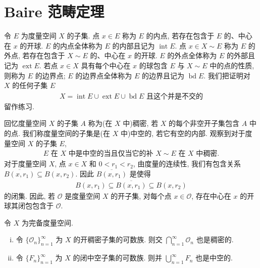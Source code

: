 \documentclass[../../main.tex]{subfiles}
\begin{document}
\section{Baire 范畴定理}\label{section:ch10-baire}

令 $E$ 为度量空间 $X$ 的子集. 点 $x\in E$ 称为 $E$ 的内点, 若存在包含于 $E$ 的、中心在 $x$ 的开球. $E$ 的内点全体称为 $E$ 的内部且记为 $\operatorname{int}E$. 点 $x\in X\sim E$ 称为 $E$ 的外点, 若存在包含于 $X\sim E$ 的、中心在 $x$ 的开球. $E$ 的外点全体称为 $E$ 的外部且记为 $\operatorname{ext}E$. 若点 $x\in X$ 具有每个中心在 $x$ 的球包含 $E$ 与 $X\sim E$ 中的点的性质, 则称为 $E$ 的边界点; $E$ 的边界点全体称为 $E$ 的边界且记为 $\operatorname{bd}E$. 我们把证明对 $X$ 的任何子集 $E$
\begin{align}
X=\operatorname{int}E\cup\operatorname{ext}E\cup\operatorname{bd}E\text{ 且这个并是不交的}\label{align:ch10-baire-5}
\end{align}
留作练习.

回忆度量空间 $X$ 的子集 $A$ 称为(在 $X$ 中)稠密, 若 $X$ 的每个非空开子集包含 $A$ 中的点. 我们称度量空间的子集是(在 $X$ 中)中空的, 若它有空的内部. 观察到对于度量空间 $X$ 的子集 $E$,
\begin{align}
E\text{ 在 }X\text{ 中是中空的当且仅当它的补 }X\sim E\text{ 在 }X\text{ 中稠密}.\label{align:ch10-baire-6}
\end{align}
对于度量空间 $X$, 点 $x\in X$ 和 $0<r_{1}<r_{2}$, 由度量的连续性, 我们有包含关系 $\overline{B(x,r_{1})}\subseteq B(x,r_{2})$. 因此 $\overline{B(x,r_{1})}$ 是使得
\begin{align*}
B(x,r_{1})\subseteq\overline{B(x,r_{1})}\subseteq B(x,r_{2})
\end{align*}
的闭集. 因此, 若 $\mathcal{O}$ 是度量空间 $X$ 的开子集, 对每个点 $x\in\mathcal{O}$, 存在中心在 $x$ 的开球其闭包包含于 $\mathcal{O}$.

\begin{theorem}\label{theorem:ch10-baire}
令 $X$ 为完备度量空间.
\begin{enumerate}[(i)]
\item 令 $\{\mathcal{O}_{n}\}_{n=1}^{\infty}$ 为 $X$ 的开稠密子集的可数族. 则交 $\bigcap_{n=1}^{\infty}\mathcal{O}_{n}$ 也是稠密的.
\item 令 $\{F_{n}\}_{n=1}^{\infty}$ 为 $X$ 的闭中空子集的可数族. 则并 $\bigcup_{n=1}^{\infty}F_{n}$ 也是中空的.
\end{enumerate}
\end{theorem}
\end{document}
